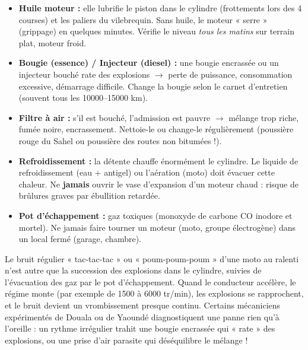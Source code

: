 \documentclass[11pt]{article}
\begin{document}
\begin{attention}
\begin{itemize}
\item \textbf{Huile moteur :} elle lubrifie le piston dans le cylindre (frottements lors des 4 courses) et les paliers du vilebrequin. Sans huile, le moteur « serre » (grippage) en quelques minutes. Vérifie le niveau \emph{tous les matins} sur terrain plat, moteur froid.
\item \textbf{Bougie (essence) / Injecteur (diesel) :} une bougie encrassée ou un injecteur bouché rate des explosions $\rightarrow$ perte de puissance, consommation excessive, démarrage difficile. Change la bougie selon le carnet d'entretien (souvent tous les \num{10000}--\num{15000} km).
\item \textbf{Filtre à air :} s'il est bouché, l'admission est pauvre $\rightarrow$ mélange trop riche, fumée noire, encrassement. Nettoie-le ou change-le régulièrement (poussière rouge du Sahel ou poussière des routes non bitumées !).
\item \textbf{Refroidissement :} la détente chauffe énormément le cylindre. Le liquide de refroidissement (eau + antigel) ou l'aération (moto) doit évacuer cette chaleur. Ne \textbf{jamais} ouvrir le vase d'expansion d'un moteur chaud : risque de brûlures graves par ébullition retardée.
\item \textbf{Pot d'échappement :} gaz toxiques (monoxyde de carbone CO inodore et mortel). Ne jamais faire tourner un moteur (moto, groupe électrogène) dans un local fermé (garage, chambre).
\end{itemize}
\end{attention}

\begin{savaistu}
Le bruit régulier « tac-tac-tac » ou « poum-poum-poum » d'une moto au ralenti n'est autre que la succession des explosions dans le cylindre, suivies de l'évacuation des gaz par le pot d'échappement. Quand le conducteur accélère, le régime monte (par exemple de \num{1500} à \num{6000} tr/min), les explosions se rapprochent, et le bruit devient un vrombissement presque continu. Certains mécaniciens expérimentés de Douala ou de Yaoundé diagnostiquent une panne rien qu'à l'oreille : un rythme irrégulier trahit une bougie encrassée qui « rate » des explosions, ou une prise d'air parasite qui déséquilibre le mélange !
\end{savaistu}
\end{document}
